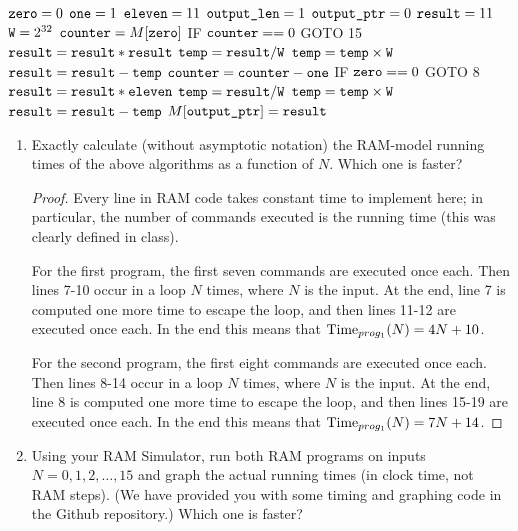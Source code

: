 \documentclass[11pt]{article}
\begin{document}
\begin{enumerate}
\begin{algorithm}[H]
\setcounter{AlgoLine}{-1}
$\texttt{zero} = 0$\;
$\texttt{one} = 1$\;
$\texttt{eleven} = 11$\;
$\texttt{output\_len} = 1$\;
$\texttt{output\_ptr} = 0$\;
$\texttt{result} = 11$\;
$\texttt{W} = 2^{32}$\;
$\texttt{counter} = M[\texttt{zero}]$\;
\Indp
IF $\texttt{counter} == 0$ GOTO 15 \;
$\texttt{result} = \texttt{result} * \texttt{result}$\;
$\texttt{temp} = \texttt{result} / \texttt{W}$\;
$\texttt{temp} = \texttt{temp} \times \texttt{W}$\;
$\texttt{result} = \texttt{result} - \texttt{temp}$\;
$\texttt{counter} = \texttt{counter} - \texttt{one}$\;
IF $\texttt{zero} == 0$ GOTO 8 \;
\Indm
$\texttt{result} = \texttt{result} * \texttt{eleven}$\;
\label{line:done2}
$\texttt{temp} = \texttt{result} / \texttt{W}$\;
$\texttt{temp} = \texttt{temp} \times \texttt{W}$\;
$\texttt{result} = \texttt{result} - \texttt{temp}$\;
$M[\texttt{output\_ptr}]=\texttt{result}$\; 
\end{algorithm}


\begin{enumerate}
    \item \label{itm:RAMtime} Exactly calculate (without asymptotic notation) the RAM-model running times of the above algorithms as a function of $N$.
    Which one is faster? 

\begin{proof}
Every line in RAM code takes constant time to implement here; in particular, the number of commands executed is the running time (this was clearly defined in class).

For the first program, the first seven commands are executed once each. Then lines 7-10 occur in a loop $N$ times, where $N$ is the input. At the end, line 7 is computed one more time to escape the loop, and then lines 11-12 are executed once each. In the end this means that $\mathrm{Time}_{prog_1} (N) = 4N + 10$.

For the second program, the first eight commands are executed once each. Then lines 8-14 occur in a loop $N$ times, where $N$ is the input. At the end, line 8 is computed one more time to escape the loop, and then lines 15-19 are executed once each. In the end this means that $\mathrm{Time}_{prog_1} (N) = 7N + 14$.
\end{proof}
    
    \item \label{itm:realtime} Using your RAM Simulator, run both RAM programs on inputs $N=0,1,2,\ldots,15$ and graph the actual running times (in clock time, not RAM steps).  (We have provided you with some timing and graphing code in the Github repository.) Which one is faster? 
    

\end{enumerate}
\end{enumerate}
\end{document}
